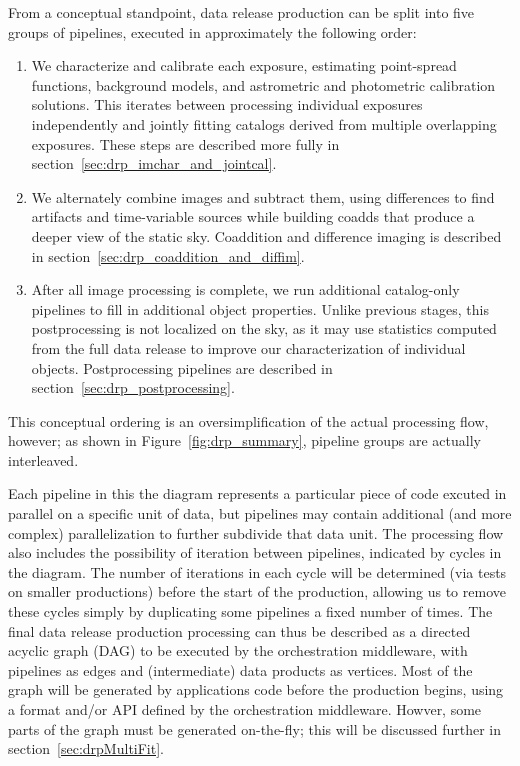 From a conceptual standpoint, data release production can be split into five groups of pipelines, executed in approximately the following order:
\begin{enumerate}
\item We characterize and calibrate each exposure, estimating point-spread functions, background models, and astrometric and photometric calibration solutions.  This iterates between processing individual exposures independently and jointly fitting catalogs derived from multiple overlapping exposures.  These steps are described more fully in section~\ref{sec:drp_imchar_and_jointcal}.
\item We alternately combine images and subtract them, using differences to find artifacts and time-variable sources while building coadds that produce a deeper view of the static sky.  Coaddition and difference imaging is described in section~\ref{sec:drp_coaddition_and_diffim}.
\item After all image processing is complete, we run additional catalog-only pipelines to fill in additional object properties.  Unlike previous stages, this postprocessing is not localized on the sky, as it may use statistics computed from the full data release to improve our characterization of individual objects.  Postprocessing pipelines are described in section~\ref{sec:drp_postprocessing}.
\end{enumerate}
This conceptual ordering is an oversimplification of the actual processing flow, however; as shown in Figure~\ref{fig:drp_summary}, pipeline groups are actually interleaved.

Each pipeline in this the diagram represents a particular piece of code excuted in parallel on a specific unit of data, but pipelines may contain additional (and more complex) parallelization to further subdivide that data unit.  The processing flow also includes the possibility of iteration between pipelines, indicated by cycles in the diagram.  The number of iterations in each cycle will be determined (via tests on smaller productions) before the start of the production, allowing us to remove these cycles simply by duplicating some pipelines a fixed number of times.  The final data release production processing can thus be described as a directed acyclic graph (DAG) to be executed by the orchestration middleware, with pipelines as edges and (intermediate) data products as vertices.  Most of the graph will be generated by applications code before the production begins, using a format and/or API defined by the orchestration middleware.  Howver, some parts of the graph must be generated on-the-fly; this will be discussed further in section~\ref{sec:drpMultiFit}.


